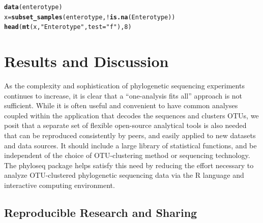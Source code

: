 \documentclass[10pt]{article}\usepackage{graphicx, color}
\makeatletter
\newcommand{\hlfunctioncall}[1]{\textcolor[rgb]{0,0,0}{\textbf{#1}}}%
\newcommand{\hlstring}[1]{\textcolor[rgb]{0,0,0}{#1}}%
\newenvironment{kframe}{%
 \def\at@end@of@kframe{}%
 \ifinner\ifhmode%
  \def\at@end@of@kframe{\end{minipage}}%
  \begin{minipage}{\columnwidth}%
 \fi\fi%
 \def\FrameCommand##1{\hskip\@totalleftmargin \hskip-\fboxsep
 \colorbox{shadecolor}{##1}\hskip-\fboxsep
     \hskip-\linewidth \hskip-\@totalleftmargin \hskip\columnwidth}%
 \MakeFramed {\advance\hsize-\width
   \@totalleftmargin\z@ \linewidth\hsize
   \@setminipage}}%
 {\par\unskip\endMakeFramed%
 \at@end@of@kframe}
\newenvironment{knitrout}{}{} %
\newcommand{\R}{{\textsf{R}}}
\makeatother
\begin{document}
\begin{knitrout}
\color{fgcolor}\begin{kframe}
\begin{alltt}
\hlfunctioncall{data}(enterotype)
x = \hlfunctioncall{subset_samples}(enterotype, !\hlfunctioncall{is.na}(Enterotype))
\hlfunctioncall{head}(\hlfunctioncall{mt}(x, \hlstring{"Enterotype"}, test = \hlstring{"f"}), 8)
\end{alltt}
\end{kframe}
\end{knitrout}



\section*{Results and Discussion}
As the complexity and sophistication
of phylogenetic sequencing experiments continues to increase,
it is clear that a ``one-analysis fits all'' approach is not sufficient.
While it is often useful and convenient to have common analyses 
coupled within the application that decodes the sequences and clusters OTUs,
we posit that a separate set of 
flexible open-source analytical tools is also needed 
that can be reproduced consistently by peers,
and easily applied to new datasets and data sources.
It should include a large library of statistical functions, 
and be independent of the choice of 
OTU-clustering method or sequencing technology.
The phyloseq package helps satisfy this need by
reducing the effort necessary to analyze
OTU-clustered phylogenetic sequencing data
via the \R{} language and interactive computing environment.



\subsection*{Reproducible Research and Sharing}
\end{document}
